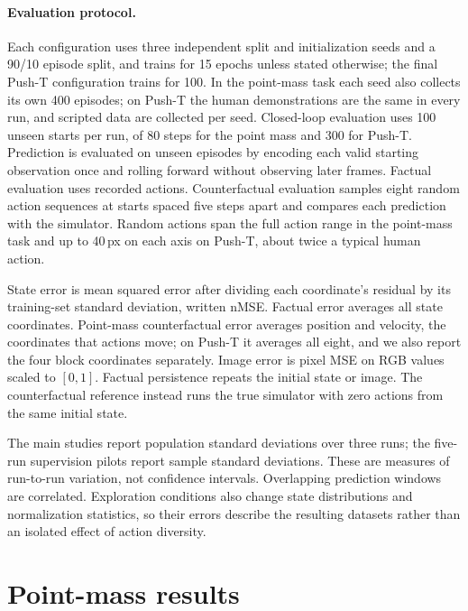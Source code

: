 \documentclass[11pt]{article}
\begin{document}
\paragraph{Evaluation protocol.} Each configuration uses three independent split and initialization seeds and a 90/10 episode split, and trains for 15 epochs unless stated otherwise; the final Push-T configuration trains for 100. In the point-mass task each seed also collects its own 400 episodes; on Push-T the human demonstrations are the same in every run, and scripted data are collected per seed. Closed-loop evaluation uses 100 unseen starts per run, of 80 steps for the point mass and 300 for Push-T. Prediction is evaluated on unseen episodes by encoding each valid starting observation once and rolling forward without observing later frames. Factual evaluation uses recorded actions. Counterfactual evaluation samples eight random action sequences at starts spaced five steps apart and compares each prediction with the simulator. Random actions span the full action range in the point-mass task and up to 40\,px on each axis on Push-T, about twice a typical human action.

State error is mean squared error after dividing each coordinate's residual by its training-set standard deviation, written nMSE. Factual error averages all state coordinates. Point-mass counterfactual error averages position and velocity, the coordinates that actions move; on Push-T it averages all eight, and we also report the four block coordinates separately. Image error is pixel MSE on RGB values scaled to $[0,1]$. Factual persistence repeats the initial state or image. The counterfactual reference instead runs the true simulator with zero actions from the same initial state.

The main studies report population standard deviations over three runs; the five-run supervision pilots report sample standard deviations. These are measures of run-to-run variation, not confidence intervals. Overlapping prediction windows are correlated. Exploration conditions also change state distributions and normalization statistics, so their errors describe the resulting datasets rather than an isolated effect of action diversity.

\section{Point-mass results}
\label{sec:lessons}
\end{document}
